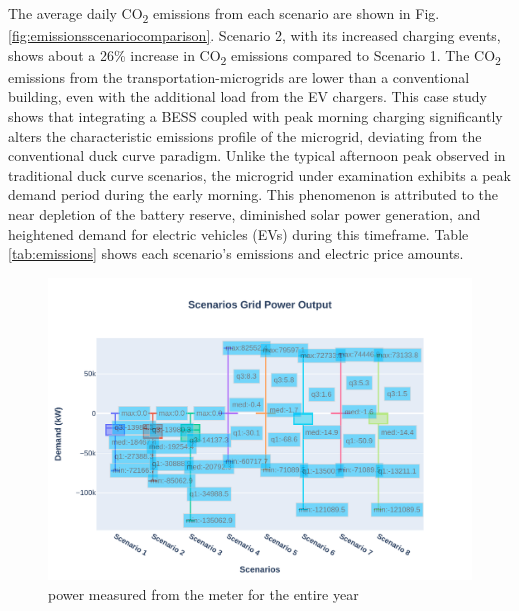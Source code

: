 \documentclass[conference, usletter]{IEEEtran}
\begin{document}
\indent The average daily CO\textsubscript{2} emissions from each scenario are shown in Fig. \ref{fig:emissionsscenariocomparison}. 
Scenario 2, with its increased charging events, shows about a 26\% increase in CO\textsubscript{2} emissions compared to Scenario 1. The CO\textsubscript{2} emissions from the transportation-microgrids are lower than a conventional building, even with the additional load from the EV chargers. This case study shows that integrating a BESS coupled with peak morning charging significantly alters the characteristic emissions profile of the microgrid, deviating from the conventional duck curve paradigm. Unlike the typical afternoon peak observed in traditional duck curve scenarios, the microgrid under examination exhibits a peak demand period during the early morning. This phenomenon is attributed to the near depletion of the battery reserve, diminished solar power generation, and heightened demand for electric vehicles (EVs) during this timeframe. Table \ref{tab:emissions} shows each scenario's emissions and electric price amounts.
\begin{figure}
\centering
\includegraphics[width=1\linewidth]{Fig/Option_3/scenarios_power_output_boxplot}
\caption{power measured from the meter for the entire year}
\label{fig:scenariospoweroutputboxplot}
\end{figure}
\end{document}
